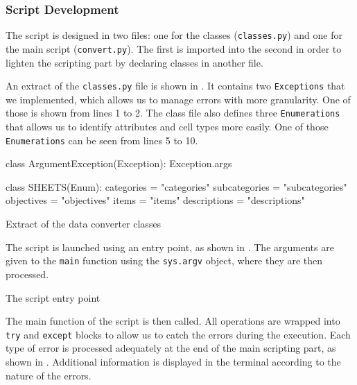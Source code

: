 \subsubsection{Script Development}
\label{subsubsec:app_implementation_data_development}

The script is designed in two files: one for the classes (\texttt{classes.py}) and one for the main script (\texttt{convert.py}). The first is imported into the second in order to lighten the scripting part by declaring classes in another file.

An extract of the \texttt{classes.py} file is shown in . It contains two  \texttt{Exceptions} that we implemented, which allows us to manage errors with more granularity. One of those is shown from lines 1 to 2. The class file also defines three \texttt{Enumerations} that allows us to identify attributes and cell types more easily. One of those \texttt{Enumerations} can be seen from lines 5 to 10.

\begin{listing}[!ht] 
	\begin{pythoncode}
class ArgumentException(Exception):
		Exception.args
	
	
class SHEETS(Enum):
	categories = "categories"
	subcategories = "subcategories"
	objectives = "objectives"
	items = "items"
	descriptions = "descriptions"
	\end{pythoncode}
	\caption{Extract of the data converter classes}
	\label{lst:app_converter_classes}
\end{listing}

The script is launched using an entry point, as shown in . The arguments are given to the \texttt{main} function using the \texttt{sys.argv} object, where they are then processed.

\begin{listing}[!ht] 
\caption{The script entry point}
\label{lst:app_converter_entry}
\end{listing}

The main function of the script is then called. All operations are wrapped into \texttt{try} and \texttt{except} blocks to allow us to catch the errors during the execution. Each type of error is processed adequately at the end of the main scripting part, as shown in . Additional information is displayed in the terminal according to the nature of the errors.

